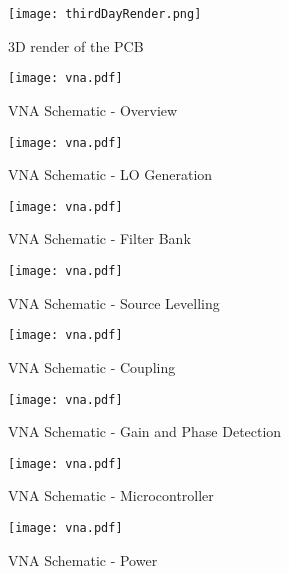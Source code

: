 \begin{landscape}
	
	\begin{figure}
		\centering
		\texttt{[image: thirdDayRender.png]}
		\caption{3D render of the PCB}
		\label{fig:pcb_render}
	\end{figure}

	\begin{figure}
		\centering
		\texttt{[image: vna.pdf]}
		\caption{VNA Schematic - Overview}
		\label{fig:vna_schematic_overview}
	\end{figure}

	\begin{figure}
		\centering
		\texttt{[image: vna.pdf]}
		\caption{VNA Schematic - LO Generation}
		\label{fig:vna_schematic_lo}
	\end{figure}
	
	\begin{figure}
		\centering
		\texttt{[image: vna.pdf]}
		\caption{VNA Schematic - Filter Bank}
		\label{fig:vna_schematic_filter}
	\end{figure}
	
	\begin{figure}
		\centering
		\texttt{[image: vna.pdf]}
		\caption{VNA Schematic - Source Levelling}
		\label{fig:vna_schematic_source_levelling}
	\end{figure}
	
	\begin{figure}
		\centering
		\texttt{[image: vna.pdf]}
		\caption{VNA Schematic - Coupling}
		\label{fig:vna_schematic_coupling}
	\end{figure}
	
	\begin{figure}
		\centering
		\texttt{[image: vna.pdf]}
		\caption{VNA Schematic - Gain and Phase Detection}
		\label{fig:vna_schematic_ad8302}
	\end{figure}
	
	\begin{figure}
		\centering
		\texttt{[image: vna.pdf]}
		\caption{VNA Schematic - Microcontroller}
		\label{fig:vna_schematic_micro}
	\end{figure}
	
	\begin{figure}
		\centering
		\texttt{[image: vna.pdf]}
		\caption{VNA Schematic - Power}
		\label{fig:vna_schematic_power}
	\end{figure}
\end{landscape}

